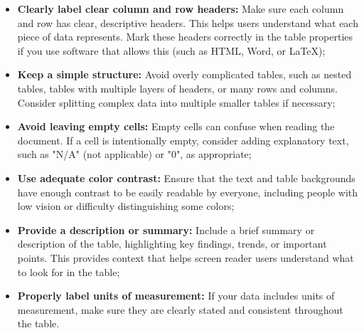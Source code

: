 \documentclass[12pt]{article}
\begin{document}
\begin{itemize}
    \item \textbf{Clearly label clear column and row headers:} Make sure each column and row has clear, descriptive headers. This helps users understand what each piece of data represents. Mark these headers correctly in the table properties if you use software that allows this (such as HTML, Word, or LaTeX);
    \item \textbf{Keep a simple structure:} Avoid overly complicated tables, such as nested tables, tables with multiple layers of headers, or many rows and columns. Consider splitting complex data into multiple smaller tables if necessary;
    \item \textbf{Avoid leaving empty cells:} Empty cells can confuse when reading the document. If a cell is intentionally empty, consider adding explanatory text, such as "N/A" (not applicable) or "0", as appropriate;
    \item \textbf{Use adequate color contrast:} Ensure that the text and table backgrounds have enough contrast to be easily readable by everyone, including people with low vision or difficulty distinguishing some colors;
    \item \textbf{Provide a description or summary:} Include a brief summary or description of the table, highlighting key findings, trends, or important points. This provides context that helps screen reader users understand what to look for in the table;
    \item \textbf{Properly label units of measurement:} If your data includes units of measurement, make sure they are clearly stated and consistent throughout the table.
\end{itemize}
\end{document}
